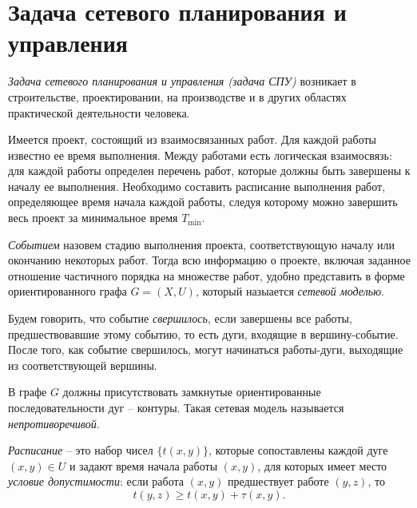 \newpage

\section{Задача сетевого планирования и управления}

\begin{definition}
  \emph{Задача сетевого планирования и управления (задача СПУ)} возникает в строительстве, проектировании, на производстве и в других областях практической деятельности человека.

  Имеется проект, состоящий из взаимосвязанных работ. Для каждой работы известно ее время выполнения. Между работами есть логическая взаимосвязь: для каждой работы определен перечень работ, которые должны быть завершены к началу ее выполнения. Необходимо составить расписание выполнения работ, определяющее время начала каждой работы, следуя которому можно завершить весь проект за минимальное время $T_{\min} $.
\end{definition}

\begin{definition}
  \emph{Событием} назовем стадию выполнения проекта, соответствующую началу или окончанию некоторых работ. Тогда всю информацию о проекте, включая заданное отношение частичного порядка на множестве работ, удобно представить в форме ориентированного графа $G = (X,U)$, который назыается \emph{сетевой моделью}.
\end{definition}

\begin{definition}
  Будем говорить, что событие \emph{свершилось}, если завершены все работы, предшествовавшие этому событию, то есть дуги, входящие в вершину-событие. После того, как событие свершилось, могут начинаться работы-дуги, выходящие из соответствующей вершины.
\end{definition}

\begin{definition}
  В графе $G$ должны присутствовать замкнутые ориентированные последовательности дуг -- контуры. Такая сетевая модель называется \emph{непротиворечивой}.
\end{definition}

\begin{definition}
  \emph{Расписание} -- это набор чисел $\big\{t(x,y)\big\}$, которые сопоставлены каждой дуге $(x,y) \in U$ и задают время начала работы $(x,y)$, для которых имеет место \emph{условие допустимости}: если работа $(x,y)$ предшествует работе $(y,z)$, то
  \[
    t(y,z) \geqslant t(x,y) + \tau (x,y).
  \]
\end{definition}

